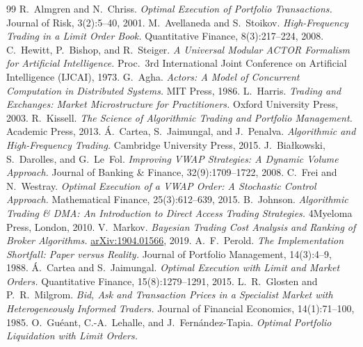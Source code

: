 \documentclass[11pt]{article}
\begin{document}
\begin{thebibliography}{99}
 R.~Almgren and N.~Chriss.
  \emph{Optimal Execution of Portfolio Transactions.}
  Journal of Risk, 3(2):5--40, 2001.
 M.~Avellaneda and S.~Stoikov.
  \emph{High-Frequency Trading in a Limit Order Book.}
  Quantitative Finance, 8(3):217--224, 2008.
 C.~Hewitt, P.~Bishop, and R.~Steiger.
  \emph{A Universal Modular ACTOR Formalism for Artificial Intelligence.}
  Proc.\ 3rd International Joint Conference on Artificial Intelligence (IJCAI),
  1973.
 G.~Agha.
  \emph{Actors: A Model of Concurrent Computation in Distributed Systems.}
  MIT Press, 1986.
 L.~Harris.
  \emph{Trading and Exchanges: Market Microstructure for Practitioners.}
  Oxford University Press, 2003.
 R.~Kissell.
  \emph{The Science of Algorithmic Trading and Portfolio Management.}
  Academic Press, 2013.
 \'A.~Cartea, S.~Jaimungal, and J.~Penalva.
  \emph{Algorithmic and High-Frequency Trading.}
  Cambridge University Press, 2015.
 J.~Bia\l kowski, S.~Darolles, and G.~Le~Fol.
  \emph{Improving VWAP Strategies: A Dynamic Volume Approach.}
  Journal of Banking \& Finance, 32(9):1709--1722, 2008.
 C.~Frei and N.~Westray.
  \emph{Optimal Execution of a VWAP Order: A Stochastic Control Approach.}
  Mathematical Finance, 25(3):612--639, 2015.
 B.~Johnson.
  \emph{Algorithmic Trading \& DMA: An Introduction to Direct Access Trading
  Strategies.} 4Myeloma Press, London, 2010.
 V.~Markov.
  \emph{Bayesian Trading Cost Analysis and Ranking of
  Broker Algorithms.} \href{https://arxiv.org/abs/1904.01566}{arXiv:1904.01566}, 2019.
 A.~F.~Perold.
  \emph{The Implementation Shortfall: Paper versus Reality.}
  Journal of Portfolio Management, 14(3):4--9, 1988.
 \'A.~Cartea and S.~Jaimungal.
  \emph{Optimal Execution with Limit and Market Orders.}
  Quantitative Finance, 15(8):1279--1291, 2015.
 L.~R.~Glosten and P.~R.~Milgrom.
  \emph{Bid, Ask and Transaction Prices in a Specialist Market with
  Heterogeneously Informed Traders.}
  Journal of Financial Economics, 14(1):71--100, 1985.
 O.~Gu\'eant, C.-A.~Lehalle, and J.~Fern\'andez-Tapia.
  \emph{Optimal Portfolio Liquidation with Limit Orders.}

\end{thebibliography}
\end{document}
